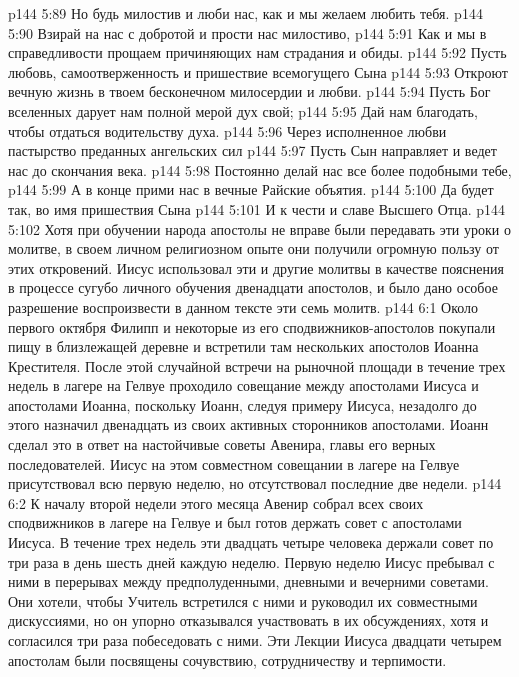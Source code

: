 \vs p144 5:89 \hsetoff Но будь милостив и люби нас, как и мы желаем любить тебя.
\vs p144 5:90 Взирай на нас с добротой и прости нас милостиво,
\vs p144 5:91 \hsetoff Как и мы в справедливости прощаем причиняющих нам страдания и обиды.
\vs p144 5:92 Пусть любовь, самоотверженность и пришествие всемогущего Сына
\vs p144 5:93 \hsetoff Откроют вечную жизнь в твоем бесконечном милосердии и любви.
\vs p144 5:94 Пусть Бог вселенных дарует нам полной мерой дух свой;
\vs p144 5:95 \hsetoff Дай нам благодать, чтобы отдаться водительству духа.
\vs p144 5:96 Через исполненное любви пастырство преданных ангельских сил
\vs p144 5:97 \hsetoff Пусть Сын направляет и ведет нас до скончания века.
\vs p144 5:98 Постоянно делай нас все более подобными тебе,
\vs p144 5:99 \hsetoff А в конце прими нас в вечные Райские объятия.
\vs p144 5:100 Да будет так, во имя пришествия Сына
\vs p144 5:101 \hsetoff И к чести и славе Высшего Отца.
\vsetoff
\vs p144 5:102 Хотя при обучении народа апостолы не вправе были передавать эти уроки о молитве, в своем личном религиозном опыте они получили огромную пользу от этих откровений. Иисус использовал эти и другие молитвы в качестве пояснения в процессе сугубо личного обучения двенадцати апостолов, и было дано особое разрешение воспроизвести в данном тексте эти семь молитв.
\vs p144 6:1 Около первого октября Филипп и некоторые из его сподвижников\hyp{}апостолов покупали пищу в близлежащей деревне и встретили там нескольких апостолов Иоанна Крестителя. После этой случайной встречи на рыночной площади в течение трех недель в лагере на Гелвуе проходило совещание между апостолами Иисуса и апостолами Иоанна, поскольку Иоанн, следуя примеру Иисуса, незадолго до этого назначил двенадцать из своих активных сторонников апостолами. Иоанн сделал это в ответ на настойчивые советы Авенира, главы его верных последователей. Иисус на этом совместном совещании в лагере на Гелвуе присутствовал всю первую неделю, но отсутствовал последние две недели.
\vs p144 6:2 К началу второй недели этого месяца Авенир собрал всех своих сподвижников в лагере на Гелвуе и был готов держать совет с апостолами Иисуса. В течение трех недель эти двадцать четыре человека держали совет по три раза в день шесть дней каждую неделю. Первую неделю Иисус пребывал с ними в перерывах между предполуденными, дневными и вечерними советами. Они хотели, чтобы Учитель встретился с ними и руководил их совместными дискуссиями, но он упорно отказывался участвовать в их обсуждениях, хотя и согласился три раза побеседовать с ними. Эти Лекции Иисуса двадцати четырем апостолам были посвящены сочувствию, сотрудничеству и терпимости.
